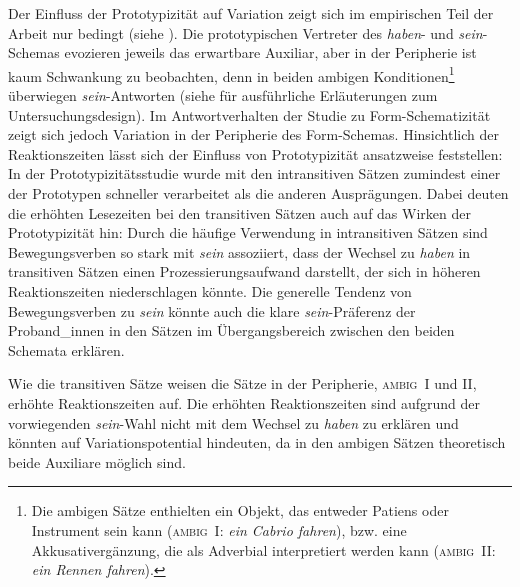 Der Einfluss der Prototypizität auf Variation zeigt sich im empirischen Teil der Arbeit nur bedingt (siehe ). Die prototypischen Vertreter des \textit{haben}- und \textit{sein}-Schemas evozieren jeweils das erwartbare Auxiliar, aber in der Peripherie ist kaum Schwankung zu beobachten, denn in beiden ambigen Konditionen\footnote{Die ambigen Sätze enthielten ein Objekt, das entweder Patiens oder Instrument sein kann (\textsc{ambig~I}: \textit{ein Cabrio fahren}), bzw. eine Akkusativergänzung, die als Adverbial interpretiert werden kann (\textsc{ambig~II}: \textit{ein Rennen fahren}).} überwiegen \textit{sein}-Antworten (siehe  für ausführliche Erläuterungen zum Untersuchungsdesign). Im Antwortverhalten der Studie zu Form-Schematizität zeigt sich jedoch Variation in der Peripherie des Form-Schemas. Hinsichtlich der Reaktionszeiten lässt sich der Einfluss von Prototypizität ansatzweise feststellen: In der Prototypizitätsstudie wurde mit den intransitiven Sätzen zumindest einer der Prototypen schneller verarbeitet als die anderen Ausprägungen. Dabei deuten die erhöhten Lesezeiten bei den transitiven Sätzen auch auf das Wirken der Prototypizität hin: Durch die häufige Verwendung in intransitiven Sätzen sind Bewegungsverben so stark mit \textit{sein} assoziiert, dass der Wechsel zu \textit{haben} in transitiven Sätzen einen Prozessierungsaufwand darstellt, der sich in höheren Reaktionszeiten niederschlagen könnte. Die generelle Tendenz von Bewegungsverben zu \textit{sein} könnte auch die klare \textit{sein}-Präferenz der Proband\_innen in den Sätzen im Übergangsbereich zwischen den beiden Schemata erklären. 


 Wie die transitiven Sätze weisen die Sätze in der Peripherie, \textsc{ambig~I} und II, erhöhte Reaktionszeiten auf. Die erhöhten Reaktionszeiten sind aufgrund der vorwiegenden \textit{sein}-Wahl nicht mit dem Wechsel zu \textit{haben} zu erklären und könnten auf Variationspotential hindeuten, da in den ambigen Sätzen theoretisch beide Auxiliare möglich sind.

